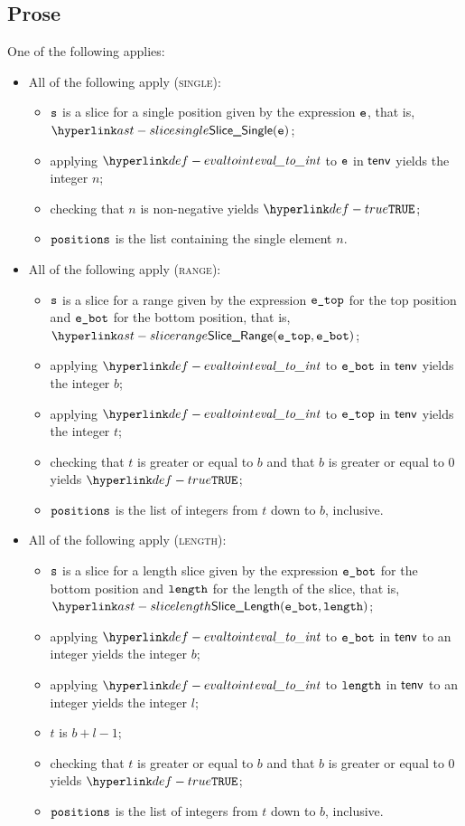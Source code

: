 \subsection{Prose}
One of the following applies:
\begin{itemize}
  \item All of the following apply (\textsc{single}):
  \begin{itemize}
    \item $\texttt{s}$ is a slice for a single position given by the expression $\texttt{e}$, that is, \\ $\SliceSingle(\ve)$;
    \item applying $\evaltoint$ to $\texttt{e}$ in $\textsf{tenv}$ yields the integer $n$\ProseOrTypeError;
    \item checking that $n$ is non-negative yields $\True$\ProseOrTypeError;
    \item $\texttt{positions}$ is the list containing the single element $n$.
  \end{itemize}

  \item All of the following apply (\textsc{range}):
  \begin{itemize}
    \item $\texttt{s}$ is a slice for a range given by the expression $\texttt{e\_top}$
          for the top position and $\texttt{e\_bot}$ for the bottom position, that is, \\ $\SliceRange(\etop, \ebot)$;
    \item applying $\evaltoint$ to $\texttt{e\_bot}$ in $\textsf{tenv}$ yields the integer $b$\ProseOrTypeError;
    \item applying $\evaltoint$ to $\texttt{e\_top}$ in $\textsf{tenv}$ yields the integer $t$\ProseOrTypeError;
    \item checking that $t$ is greater or equal to $b$ and that $b$ is greater or equal to $0$ yields $\True$\ProseOrTypeError;
    \item $\texttt{positions}$ is the list of integers from $t$ down to $b$, inclusive.
  \end{itemize}

  \item All of the following apply (\textsc{length}):
  \begin{itemize}
    \item $\texttt{s}$ is a slice for a length slice given by the expression $\texttt{e\_bot}$
          for the bottom position and $\texttt{length}$ for the length of the slice, that is, \\ $\SliceLength(\ebot, \elength)$;
    \item applying $\evaltoint$ to $\texttt{e\_bot}$ in $\textsf{tenv}$ to an integer yields the integer $b$\ProseOrTypeError;
    \item applying $\evaltoint$ to $\texttt{length}$ in $\textsf{tenv}$ to an integer yields the integer $l$\ProseOrTypeError;
    \item $t$ is $b + l - 1$;
    \item checking that $t$ is greater or equal to $b$ and that $b$ is greater or equal to $0$ yields $\True$\ProseOrTypeError;
    \item $\texttt{positions}$ is the list of integers from $t$ down to $b$, inclusive.
  \end{itemize}


\end{itemize}
